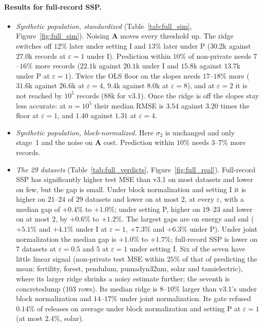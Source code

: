 \documentclass[11pt]{article}
\theoremstyle{definition}
\theoremstyle{plain}
\newcommand{\bA}{\mathbf{A}}
\begin{document}
\paragraph{Results for full-record SSP.}
\begin{itemize}
  \item \emph{Synthetic population, standardized} (Table~\ref{tab:full_sim}, Figure~\ref{fig:full_sim}). Noising $\bA$ moves every threshold up. The ridge switches off $12\%$ later under setting I and $13\%$ later under P ($30.2$k against $27.0$k records at $\varepsilon = 1$ under I). Prediction within $10\%$ of non-private needs $7$--$16\%$ more records ($22.1$k against $20.1$k under I and $15.8$k against $13.7$k under P at $\varepsilon = 1$). Twice the OLS floor on the slopes needs $17$--$18\%$ more ($31.6$k against $26.6$k at $\varepsilon = 4$, $9.4$k against $8.0$k at $\varepsilon = 8$), and at $\varepsilon = 2$ it is not reached by $10^5$ records ($88$k for v3.1). Once the ridge is off the slopes stay less accurate: at $n = 10^5$ their median RMSE is $3.54$ against $3.20$ times the floor at $\varepsilon = 1$, and $1.40$ against $1.31$ at $\varepsilon = 4$.
  \item \emph{Synthetic population, block-normalized.} Here $\sigma_2$ is unchanged and only stage~1 and the noise on $\bA$ cost. Prediction within $10\%$ needs $3$--$7\%$ more records.
  \item \emph{The 29 datasets} (Table~\ref{tab:full_verdicts}, Figure~\ref{fig:full_real}). Full-record SSP has significantly higher test MSE than v3.1 on most datasets and lower on few, but the gap is small. Under block normalization and setting I it is higher on $21$--$24$ of $29$ datasets and lower on at most $2$, at every $\varepsilon$, with a median gap of $+0.4\%$ to $+1.0\%$; under setting P, higher on $19$--$23$ and lower on at most $2$, by $+0.6\%$ to $+1.2\%$. The largest gaps are on energy and sml ($+5.1\%$ and $+4.1\%$ under I at $\varepsilon = 1$, $+7.3\%$ and $+6.3\%$ under P). Under joint normalization the median gap is $+1.0\%$ to $+1.7\%$; full-record SSP is lower on $7$ datasets at $\varepsilon = 0.5$ and $5$ at $\varepsilon = 1$ under setting I. Six of the seven have little linear signal (non-private test MSE within $25\%$ of that of predicting the mean: fertility, forest, pendulum, pumadyn32nm, solar and tamielectric), where its larger ridge shrinks a noisy estimate further; the seventh is concreteslump ($103$ rows). Its median ridge is $8$--$10\%$ larger than v3.1's under block normalization and $14$--$17\%$ under joint normalization. Its gate refused $0.14\%$ of releases on average under block normalization and setting P at $\varepsilon = 1$ (at most $2.4\%$, solar).

\end{itemize}
\end{document}
